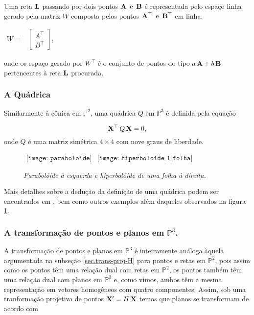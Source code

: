 Uma reta ${\bf L}$ passando por dois pontos ${\bf A} \,\,\, \text{e} \,\,\, {\bf B}$ é representada pelo espaço linha gerado pela matriz $W$ composta pelos pontos ${\bf A}^\top \,\,\,\text{e} \,\,\, {\bf B}^\top$ em linha:

\begin{center}
$
\begin{array}{cc}
W = 
& \begin{bmatrix}
  A^\top\\
  B^\top
  \end{bmatrix},
\end{array}
$
\end{center}
onde os espaço gerado por $W^\top$ é o conjunto de pontos do tipo $a\,{\bf A} + b\,{\bf B}$ pertencentes à reta ${\bf L}$ procurada. \\


\subsubsection{A Quádrica}


Similarmente à cônica em $\mathbb{P}^2$, uma quádrica $Q$ em $\mathbb{P}^3$ é definida pela equação

\begin{equation*}
\mathbf{X}^\top\,Q\,\mathbf{X} = 0,
\end{equation*}
onde $Q$ é uma matriz simétrica $4\times4$ com nove graus de liberdade.




\begin{figure}[!htb]
$
\begin{array}{cc}
\texttt{[image: paraboloide]}
&
\texttt{[image: hiperboloide\_1\_folha]}
\end{array}
$
\caption{\textit{Parabolóide à esquerda e hiperbolóide de uma folha à direita.}}
\label{quadricas}
\end{figure}


Mais detalhes sobre a dedução da definição de uma quádrica podem ser encontrados em \cite{Hartley2004}, bem como outros exemplos além daqueles observados na figura \ref{quadricas}.\\

\subsubsection{A transformação de pontos e planos em $\mathbb{P}^3$.}\label{sec.trans-pontos-planos-P3}

A transformação de pontos e planos em $\mathbb{P}^3$ é inteiramente análoga àquela argumentada na subseção \ref{sec.trans-proj-H} para pontos e retas em $\mathbb{P}^2$, pois assim como os pontos têm uma relação dual com retas em $\mathbb{P}^2$, os pontos também têm uma relação dual com planos em $\mathbb{P}^3$ e, como vimos, ambos têm a mesma representação em vetores homogêneos com quatro componentes. Assim, sob uma tranformação projetiva de pontos $\mathbf{X}'=H\,\mathbf{X}$ temos que planos se transformam de acordo com

